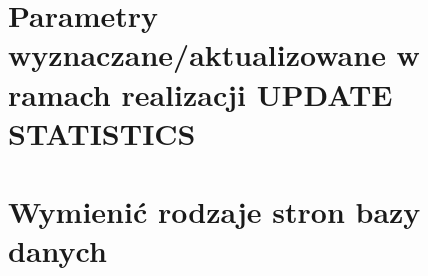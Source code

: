 \documentclass[a4paper,twoside]{article}
\begin{document}
  	\section*{Parametry wyznaczane/aktualizowane w ramach realizacji UPDATE STATISTICS}
  	
  	\section*{Wymienić rodzaje stron bazy danych}
  	
  	
  
\end{document}
